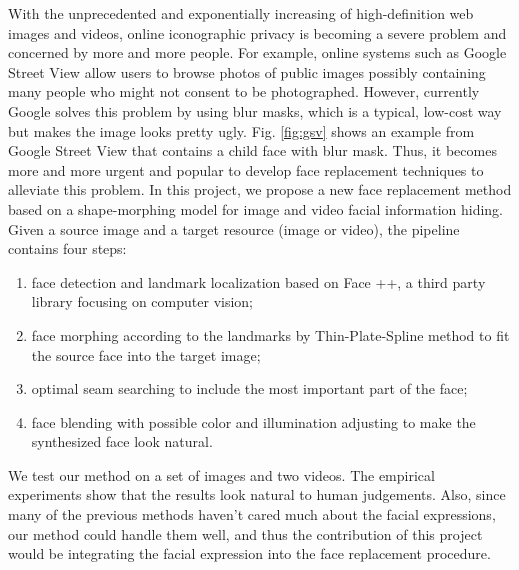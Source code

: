 \documentclass[10pt,twocolumn,letterpaper]{article}
\begin{document}
With the unprecedented and exponentially increasing of high-definition web images and videos, online iconographic privacy is becoming a severe problem and concerned by more and more people. For example, online systems such as Google Street View allow users to browse photos of public images possibly containing many people who might not consent to be photographed. However, currently Google solves this problem by using blur masks, which is a typical, low-cost way but makes the image looks pretty ugly. Fig. \ref{fig:gsv} shows an example from Google Street View that contains a child face with blur mask. Thus, it becomes more and more urgent and popular to develop face replacement techniques to alleviate this problem. In this project, we propose a new face replacement method based on a shape-morphing model for image and video facial information hiding. Given a source image and a target resource (image or video), the pipeline contains four steps:
\begin{enumerate}
 \item face detection and landmark localization based on Face ++, a third party library focusing on computer vision;
 \item face morphing according to the landmarks by Thin-Plate-Spline method to fit the source face into the target image;
 \item optimal seam searching to include the most important part of the face;
 \item face blending with possible color and illumination adjusting to make the synthesized face look natural.
 \end{enumerate}
 We test our method on a set of images and two videos. The empirical experiments show that the results look natural to human judgements. Also, since many of the previous methods haven't cared much about the facial expressions, our method could handle them well, and thus the contribution of this project would be integrating the facial expression into the face replacement procedure.
\end{document}
